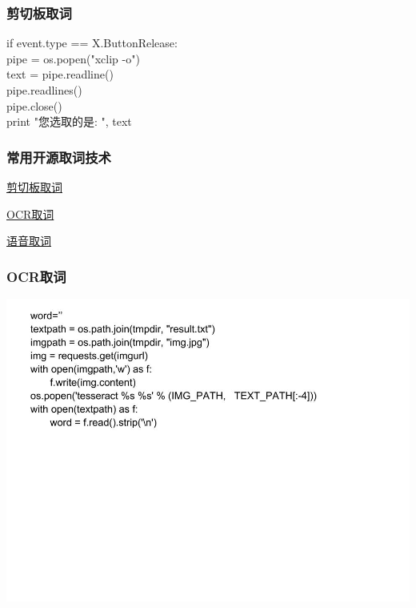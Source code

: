 \documentclass[10pt]{beamer}
\begin{document}
\begin{CJK*}{UTF8}{song}
\begin{frame}
   \frametitle{剪切板取词}
if event.type == X.ButtonRelease: \\
    pipe = os.popen("xclip -o") \\
    text = pipe.readline() \\
    pipe.readlines() \\
    pipe.close() \\
    print "您选取的是: ", text \\
\end{frame}

\begin{frame}
  \frametitle{\Large{常用开源取词技术}}
\LARGE\begin{itemize}
 {\item \href{http://nullege.com/codes/show/src@p@y@python-xlib-HEAD@trunk@examples@record_demo.py/86/Xlib.display.Display.record_create_context}{剪切板取词}
  \item \href{https://code.google.com/p/tesseract-ocr/}{OCR取词}
  \item \href{http://www.athoughtabroad.com/2013/05/22/using-google-s-speech-recognition-web-service-with-python}{语音取词}}
\end{itemize}
\end{frame}

\begin{frame}
   \frametitle{OCR取词}
   \includegraphics[width=1.2\textwidth]{ocr.jpg}
\end{frame}


\end{CJK*}
\end{document}
